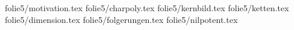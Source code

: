 %
%
%
folie{5/motivation.tex}
folie{5/charpoly.tex}
folie{5/kernbild.tex}
folie{5/ketten.tex}
folie{5/dimension.tex}
folie{5/folgerungen.tex}
folie{5/nilpotent.tex}
